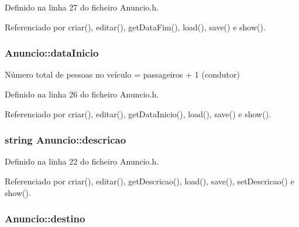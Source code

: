 Definido na linha 27 do ficheiro Anuncio.\+h.



Referenciado por criar(), editar(), get\+Data\+Fim(), load(), save() e show().

\hypertarget{class_anuncio_abeb7d8c5fe5e7d127005044981a3cd3d}{
\subsubsection[{data\+Inicio}]{ Anuncio\+::data\+Inicio\hspace{0.3cm}{\ttfamily [protected]}}}\label{class_anuncio_abeb7d8c5fe5e7d127005044981a3cd3d}


Número total de pessoas no veículo = passageiros + 1 (condutor) 



Definido na linha 26 do ficheiro Anuncio.\+h.



Referenciado por criar(), editar(), get\+Data\+Inicio(), load(), save() e show().

\hypertarget{class_anuncio_aa6a9eb8d08cb06d16061b006eb2c8b97}{
\subsubsection[{descricao}]{\setlength{\rightskip}{0pt plus 5cm}string Anuncio\+::descricao\hspace{0.3cm}{\ttfamily [protected]}}}\label{class_anuncio_aa6a9eb8d08cb06d16061b006eb2c8b97}


Definido na linha 22 do ficheiro Anuncio.\+h.



Referenciado por criar(), editar(), get\+Descricao(), load(), save(), set\+Descricao() e show().

\hypertarget{class_anuncio_acdac86595f84cfb8a2bf54c414857168}{
\subsubsection[{destino}]{ Anuncio\+::destino\hspace{0.3cm}{\ttfamily [protected]}}}\label{class_anuncio_acdac86595f84cfb8a2bf54c414857168}


